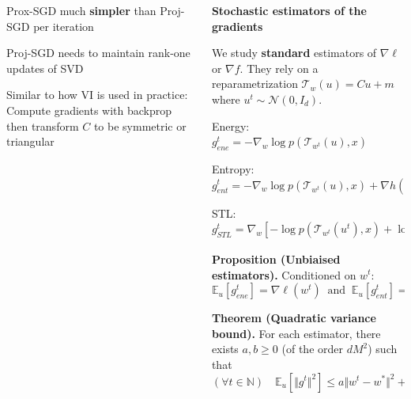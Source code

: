 \documentclass[final]{beamer}
\newcommand{\vsp}{\vspace{15pt}} %
\begin{document}
\begin{frame}{}
\begin{columns}[t]
\begin{column}{0.30\linewidth}
\begin{colorblock}[backgroundcolor=orange_dark]
\vsp \vsp


Prox-SGD much {\color{purple_fat}\textbf{simpler}} than Proj-SGD per iteration

Proj-SGD needs to maintain rank-one updates of SVD

Similar to how VI is used in practice: Compute gradients with backprop then transform $C$ to be symmetric or triangular
\end{colorblock}

			
			
		\end{column}%
		\begin{column}{0.30\linewidth}
\begin{colorblock}[backgroundcolor=green_dark]
	
			
\textbf{\large Stochastic estimators of the gradients}
\vsp \vsp 

We study {\color{blue_fat}\textbf{standard}} estimators of $\nabla \ell$ or $\nabla f$.
They rely on a reparametrization $\mathcal{T}_w(u) = Cu+m$ where $u^t \sim \mathcal{N}(0,I_d)$.

\vsp

 Energy: $g^t_{ene} = - \nabla_w \log p(\mathcal{T}_{w^t}(u),x)$

 Entropy: $g^t_{ent} = - \nabla_w \log p(\mathcal{T}_{w^t}(u),x) + \nabla h(w^t)$

 STL: $g^t_{STL} = \nabla_w \left[ - \log p(\mathcal{T}_{w^t}(u^t),x) + \log q_v(\mathcal{T}_{w^t}(u^t)) \right]_{v=w^t}$


\vsp \vsp

\textbf{Proposition (Unbiaised estimators).} Conditioned on $w^t$:
\begin{equation*}
    \mathbb{E}_u\left[ g^t_{ene}  \right] = \nabla \ell(w^t) 
    \ \text{ and } \ 
    \mathbb{E}_u\left[ g^t_{ent}  \right] = 
    \mathbb{E}_u\left[ g^t_{STL}  \right] = \nabla f(w^t) 
\end{equation*}

\vsp \vsp

\textbf{Theorem (Quadratic variance bound).} 
For each estimator, there exists $a,b \geq 0$ (of the order $dM^2$) such that
\begin{equation*}
(\forall t \in \mathbb{N}) \quad 
    \mathbb{E}_u\left[ \Vert g^t \Vert^2 \right] \leq a \Vert w^t - w^* \Vert^2 + b
\end{equation*}


\end{colorblock}
\end{column}
\end{columns}
\end{frame}
\end{document}
